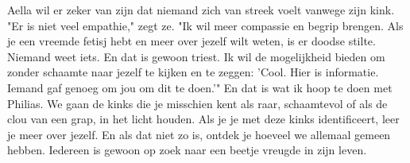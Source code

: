 Aella wil er zeker van zijn dat niemand zich van streek voelt vanwege zijn kink. "Er is niet veel empathie," zegt ze. "Ik wil meer compassie en begrip brengen. Als je een vreemde fetisj hebt en meer over jezelf wilt weten, is er doodse stilte. Niemand weet iets. En dat is gewoon triest. Ik wil de mogelijkheid bieden om zonder schaamte naar jezelf te kijken en te zeggen: 'Cool. Hier is informatie. Iemand gaf genoeg om jou om dit te doen.'"
En dat is wat ik hoop te doen met Philias. We gaan de kinks die je misschien kent als raar, schaamtevol of als de clou van een grap, in het licht houden. Als je je met deze kinks identificeert, leer je meer over jezelf. En als dat niet zo is, ontdek je hoeveel we allemaal gemeen hebben. Iedereen is gewoon op zoek naar een beetje vreugde in zijn leven.
